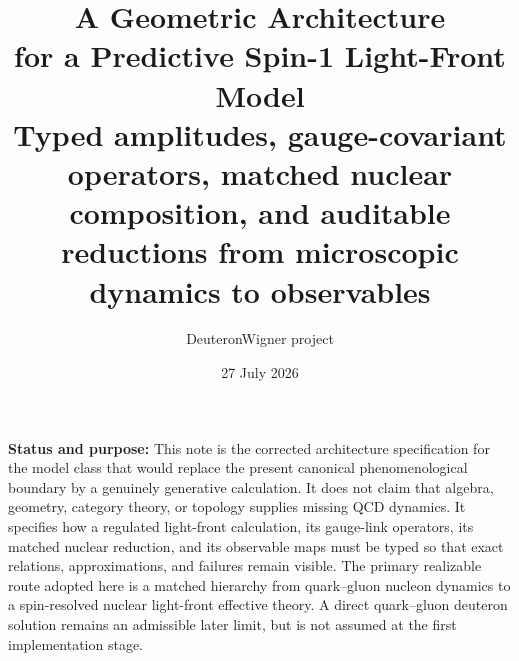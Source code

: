 \documentclass[11pt]{article}
\title{\vspace{-1.0cm}
{\color{navy}\bfseries A Geometric Architecture\\[2mm]
for a Predictive Spin-1 Light-Front Model}\\[4mm]
\large Typed amplitudes, gauge-covariant operators, matched nuclear composition,
and auditable reductions from microscopic dynamics to observables}
\author{DeuteronWigner project}
\date{27 July 2026}
\begin{document}
\maketitle

\begin{center}
\begin{minipage}{0.94\textwidth}
{\parbox{0.96\textwidth}{
\textbf{Status and purpose:}
This note is the corrected architecture specification for the model class that
would replace the present canonical phenomenological boundary by a genuinely
generative calculation.  It does not claim that algebra, geometry, category
theory, or topology supplies missing QCD dynamics.  It specifies how a
regulated light-front calculation, its gauge-link operators, its matched
nuclear reduction, and its observable maps must be typed so that exact
relations, approximations, and failures remain visible.  The primary
realizable route adopted here is a matched hierarchy from quark--gluon
nucleon dynamics to a spin-resolved nuclear light-front effective theory.
A direct quark--gluon deuteron solution remains an admissible later limit, but
is not assumed at the first implementation stage.
}}
\end{minipage}
\end{center}
\end{document}
